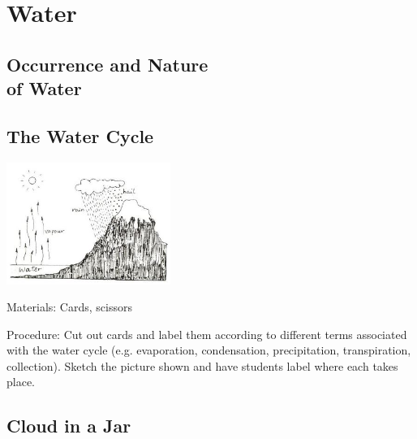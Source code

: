 \section{Water}

\begin{multicols}{2}


\section*{Occurrence and Nature \hfill \\ of Water}


\subsection{The Water Cycle}

\begin{center}
\includegraphics[width=0.4\textwidth]{./img/source/water-cycle.jpg}
\end{center}

\begin{description*}
\item[Materials:]{Cards, scissors}
\item[Procedure:]{Cut out cards and label them according to different terms associated with the water cycle (e.g. evaporation, condensation, precipitation, transpiration, collection). Sketch the picture shown and have students label where each takes place.}
\end{description*}

\subsection{Cloud in a Jar}


\end{multicols}
